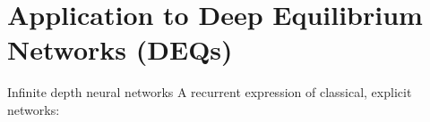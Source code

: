 \documentclass{beamer}
\begin{document}
\section{Application to Deep Equilibrium Networks (DEQs)}
\parttitleframe{}


\begin{frame}{Infinite depth neural networks}
    A recurrent expression of classical, explicit networks:





    \end{frame}
\end{document}
